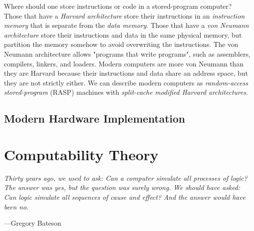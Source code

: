 Where should one store instructions or code in a stored-program computer? Those that have a \textit{Harvard architecture} store their instructions in an \textit{instruction memory} that is separate from the \textit{data memory}. Those that have a \textit{von Neumann architecture} store their instructions and data in the same physical memory, but partition the memory somehow to avoid overwriting the instructions. The von Neumann architecture allows "programs that write programs", such as assemblers, compilers, linkers, and loaders. Modern computers are more von Neumann than they are Harvard because their instructions and data share an address space, but they are not strictly either. We can describe modern computers as \textit{random-access stored-program} (RASP) machines with \textit{split-cache modified Harvard architectures}. \\


\subsection{Modern Hardware Implementation}


	

\toclineskip
\section{Computability Theory}

\vspace{4mm}
\begin{displayquote}
\textit{Thirty years ago, we used to ask: Can a computer simulate all processes of logic? The answer was yes, but the question was surely wrong. We should have asked: Can logic simulate all sequences of cause and effect? And the answer would have been no.}
\begin{flushright}
	---Gregory Bateson
\end{flushright}
\end{displayquote}
\vspace{4mm}

